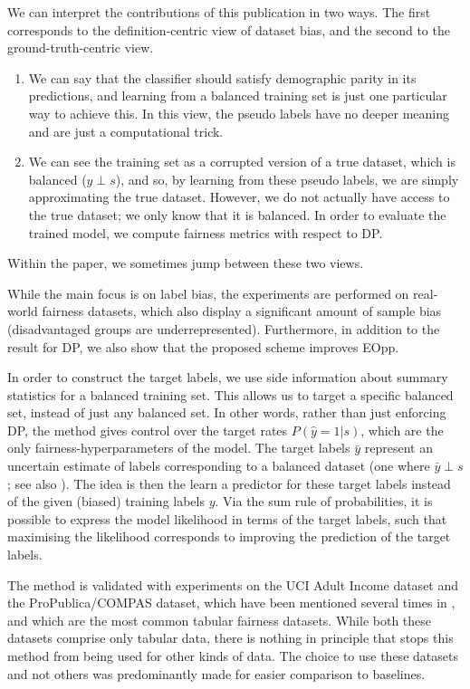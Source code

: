 We can interpret the contributions of this publication in two ways.
The first corresponds to the definition-centric view of dataset bias,
and the second to the ground-truth-centric view.
\begin{enumerate}
  \item
    We can say that the classifier should satisfy demographic parity in its predictions,
    and learning from a balanced training set is just one particular way to achieve this.
    In this view, the pseudo labels have no deeper meaning and are just a computational trick.
  \item
    We can see the training set as a corrupted version of a true dataset, which is balanced (\(y\perp s\)),
    and so, by learning from these pseudo labels, we are simply approximating the true dataset.
    However, we do not actually have access to the true dataset; we only know that it is balanced.
    In order to evaluate the trained model, we compute fairness metrics with respect to \ac{DP}.
\end{enumerate}
Within the paper, we sometimes jump between these two views.

While the main focus is on label bias,
the experiments are performed on real-world fairness datasets,
which also display a significant amount of sample bias (disadvantaged groups are underrepresented).
Furthermore, in addition to the result for \ac{DP}, we also show that the proposed scheme improves \acf{EOpp}.

In order to construct the target labels,
we use side information about summary statistics for a balanced training set.
This allows us to target a specific balanced set, instead of just any balanced set.
In other words, rather than just enforcing \ac{DP}, the method gives control over the target rates \(P(\hat{y}=1|s)\),
which are the only fairness-hyperparameters of the model.
The target labels \(\bar{y}\) represent an uncertain estimate of labels corresponding to a balanced dataset
(one where \(\bar{y} \perp s\); see also ).
The idea is then the learn a predictor for these target labels instead of the given (biased) training labels \(y\).
Via the sum rule of probabilities, it is possible to express the model likelihood in terms of the target labels,
such that maximising the likelihood corresponds to improving the prediction of the target labels.

The method is validated with experiments
on the UCI Adult Income dataset and the ProPublica/COMPAS dataset,
which have been mentioned several times in ,
and which are the most common tabular fairness datasets.
While both these datasets comprise only tabular data,
there is nothing in principle that stops this method from being used for other kinds of data.
The choice to use these datasets and not others
was predominantly made for easier comparison to baselines.

